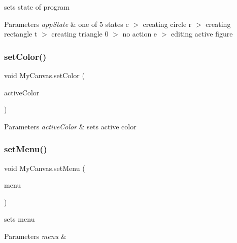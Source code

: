 sets state of program 
\begin{DoxyParams}{Parameters}
{\em app\+State} & one of 5 states \textquotesingle{}c\textquotesingle{} $>$ creating circle \textquotesingle{}r\textquotesingle{} $>$ creating rectangle \textquotesingle{}t\textquotesingle{} $>$ creating triangle \textquotesingle{}0\textquotesingle{} $>$ no action \textquotesingle{}e\textquotesingle{} $>$ editing active figure \\
\hline
\end{DoxyParams}
\mbox{\label{classMyCanvas_a13b35b0c7537a55f61ba289697008e8f}} 
\subsubsection{\texorpdfstring{set\+Color()}{setColor()}}
{\footnotesize\ttfamily void My\+Canvas.\+set\+Color (\begin{DoxyParamCaption}\item[{Color}]{active\+Color }\end{DoxyParamCaption})\hspace{0.3cm}{\ttfamily [inline]}}


\begin{DoxyParams}{Parameters}
{\em active\+Color} & sets active color \\
\hline
\end{DoxyParams}
\mbox{\label{classMyCanvas_a62132badab6a4da5f847d3815cc40c44}} 
\subsubsection{\texorpdfstring{set\+Menu()}{setMenu()}}
{\footnotesize\ttfamily void My\+Canvas.\+set\+Menu (\begin{DoxyParamCaption}\item[{\hyperlink{classMyMenu}{My\+Menu}}]{menu }\end{DoxyParamCaption})\hspace{0.3cm}{\ttfamily [inline]}}

sets menu 
\begin{DoxyParams}{Parameters}
{\em menu} & \\
\hline
\end{DoxyParams}
\mbox{\label{classMyCanvas_a8d826ca38478d6a5b5cae7f418a898b3}} 
